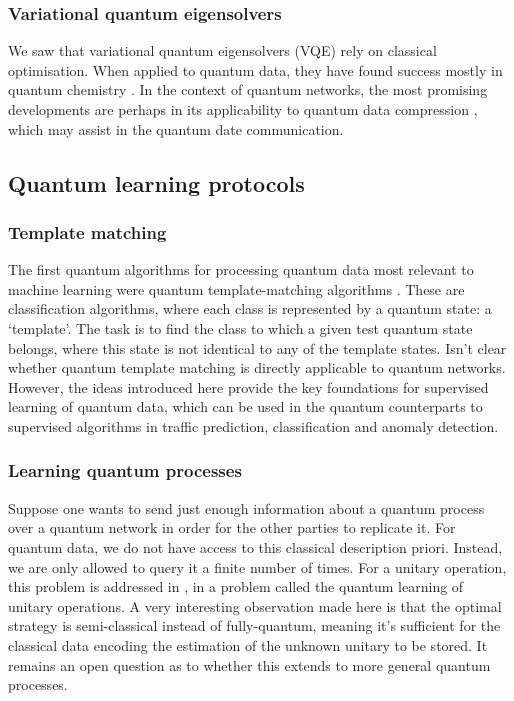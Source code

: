 \documentclass[twocolumn, aps, rmp, amsmath, amssymb, nofootinbib, superscriptaddress, longbibliography, floatfix, table-of-contents, eqsecnum]{revtex4}
\begin{document}
\subsubsection{Variational quantum eigensolvers}

We saw that variational quantum eigensolvers (VQE) rely on classical optimisation. When applied to quantum data, they have found success mostly in quantum chemistry \cite{bib:peruzzo2014peruzzo, bib:moll2018quantum}. In the context of quantum networks, the most promising developments are perhaps in its applicability to quantum data compression \cite{bib:jonromero}, which may assist in the quantum date communication. 

\subsection{Quantum learning protocols}

\subsubsection{Template matching}

The first quantum algorithms for processing quantum data most relevant to machine learning were quantum template-matching algorithms \cite{bib:sasaki1, bib:sasaki2}. These are classification algorithms, where each class is represented by a quantum state: a `template'. The task is to find the class to which a given test quantum state belongs, where this state is not identical to any of the template states. Isn't clear whether quantum template matching is directly applicable to quantum networks. However, the ideas introduced here provide the key foundations for supervised learning of quantum data, which can be used in the quantum counterparts to supervised algorithms in traffic prediction, classification and anomaly detection.

\subsubsection{Learning quantum processes}

Suppose one wants to send just enough information about a quantum process over a quantum network in order for the other parties to replicate it. For quantum data, we do not have access to this classical description priori. Instead, we are only allowed to query it a finite number of times. For a unitary operation, this problem is addressed in \cite{bib:bisio_optimal_2010}, in a problem called the quantum learning of unitary operations. A very interesting observation made here is that the optimal strategy is semi-classical instead of fully-quantum, meaning it's sufficient for the classical data encoding the estimation of the unknown unitary to be stored. It remains an open question as to whether this extends to more general quantum processes.
\end{document}

